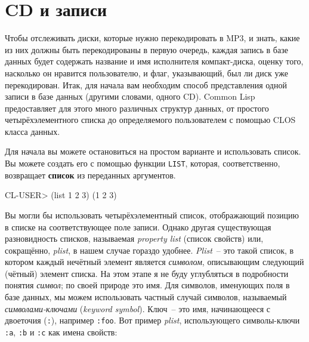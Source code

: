 \section{CD и записи}

Чтобы отслеживать диски, которые нужно перекодировать в MP3, и знать, какие из них должны
быть перекодированы в первую очередь, каждая запись в базе данных будет содержать название
и имя исполнителя компакт-диска, оценку того, насколько он нравится пользователю, и флаг,
указывающий, был ли диск уже перекодирован. Итак, для начала вам необходим способ
представления одной записи в базе данных (другими словами, одного CD). Common Lisp
предоставляет для этого много различных структур данных, от простого четырёхэлементного
списка до определяемого пользователем с помощью CLOS класса данных.

Для начала вы можете остановиться на простом варианте и использовать список. Вы можете
создать его с помощью функции \lstinline{LIST}, которая, соответственно, возвращает
\textbf{список}  из
переданных аргументов.

\begin{myverb}
CL-USER> (list 1 2 3)
 (1 2 3)
\end{myverb}

Вы могли бы использовать четырёхэлементный список, отображающий позицию в списке на
соответствующее поле записи. Однако другая существующая разновидность списков, называемая
\textit{property list} (список свойств) или, сокращённо, \textit{plist}, в нашем случае
гораздо удобнее. \textit{Plist}~-- это такой список, в котором каждый нечётный элемент
является \textit{символом}, описывающим следующий (чётный) элемент списка. На этом этапе я
не буду углубляться в подробности понятия \textit{символ}; по своей природе это имя. Для
символов, именующих поля в базе данных, мы можем использовать частный случай символов,
называемый \textit{символами-ключами} (\textit{keyword symbol}). Ключ~-- это имя,
начинающееся с двоеточия (\lstinline{:}), например \lstinline{:foo}. Вот пример \textit{plist}, использующего символы-ключи \lstinline{:a},
\lstinline{:b} и \lstinline{:c} как имена свойств:

